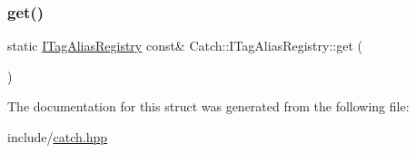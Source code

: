 \mbox{\label{struct_catch_1_1_i_tag_alias_registry_aa9d0f008f49473389c7abf6071f137a7}} 
\subsubsection{\texorpdfstring{get()}{get()}}
{\footnotesize\ttfamily static \mbox{\hyperlink{struct_catch_1_1_i_tag_alias_registry}{I\+Tag\+Alias\+Registry}} const\& Catch\+::\+I\+Tag\+Alias\+Registry\+::get (\begin{DoxyParamCaption}{ }\end{DoxyParamCaption})\hspace{0.3cm}{\ttfamily [static]}}



The documentation for this struct was generated from the following file\+:\begin{DoxyCompactItemize}
\item 
include/\mbox{\hyperlink{catch_8hpp}{catch.\+hpp}}\end{DoxyCompactItemize}
